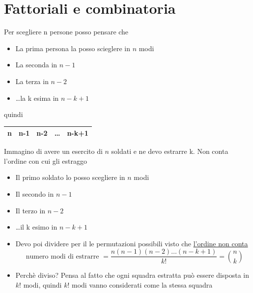 \section{Fattoriali e combinatoria}
Per scegliere n persone posso pensare che 
 \begin{itemize}
	\item La prima persona la posso scieglere in $n$ modi
	\item La seconda in $n-1$
	\item La terza in $n-2$
	\item \ldots la k esima in $n-k+1$
\end{itemize}
quindi
\begin{table}[h!]
	\centering
	\begin{tabular}{|c|c|c|c|c|}
	\hline
	n & n-1 & n-2 & \ldots & n-k+1 \\
	\hline
	\end{tabular}
\end{table}

Immagino di avere un esercito di $n$ soldati e ne devo estrarre k. Non conta l'ordine con cui gli estraggo
\begin{itemize}
	\item Il primo soldato lo posso scegliere in $n$ modi
	\item Il secondo in $n-1$
	\item Il terzo in $n-2$
	\item \ldots il k esimo in $n-k+1$
	\item Devo poi dividere per il le permutazioni possibili visto che \underline{l'ordine non conta}
	\[
	\text{ numero modi di estrarre } = \frac{n\left( n-1 \right) \left( n-2 \right) \ldots \left( n-k+1 \right)}{k!} = \binom{n}{k}
	\] 
	\item Perchè diviso? Pensa al fatto che ogni squadra estratta può essere disposta in $k!$ modi, quindi $k!$ modi vanno considerati come la stessa squadra
\end{itemize}
